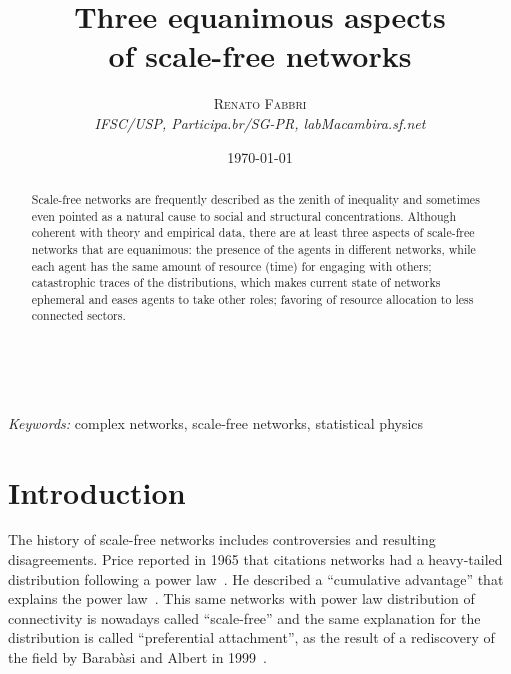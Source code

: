 \documentclass[a4paper, 11pt]{article} %
\title{\textbf{Three equanimous aspects\\of scale-free networks}\\ %
} %
\author{\textsc{Renato Fabbri} %
\\{\textit{IFSC/USP, Participa.br/SG-PR, labMacambira.sf.net}}} %
\date{\today} %
\makeatletter
\renewcommand{\maketitle}{ %
\begin{flushright} %
{\LARGE\@title} %

\vspace{50pt} %

{\large\@author} %
\\\@date %

\vspace{40pt} %
\end{flushright}
}
\makeatother
\begin{document}
\maketitle %




\begin{abstract}
Scale-free networks are frequently described as the zenith of inequality and sometimes even pointed as a natural cause to social and structural concentrations. Although coherent with theory and empirical data, there are at least three aspects of scale-free networks that are equanimous: the presence of the agents in different networks, while each agent has the same amount of resource (time) for engaging with others; catastrophic traces of the distributions, which makes current state of networks ephemeral and eases agents to take other roles; favoring of resource allocation to less connected sectors.
\end{abstract}

%

\hspace*{3,6mm}\textit{Keywords:} complex networks, scale-free networks, statistical physics %


\newpage
\tableofcontents


\section{Introduction}\label{sec:intro}
The history of scale-free networks includes controversies and resulting disagreements. Price reported in 1965 that citations networks had a heavy-tailed distribution following a power law~\cite{price1}. He described a ``cumulative advantage'' that explains the power law~\cite{price2}. This same networks with power law distribution of connectivity is nowadays called ``scale-free'' and the same explanation for the distribution is called ``preferential attachment'', as the result of a rediscovery of the field by Barab\`asi and Albert in 1999~\cite{barabasi1}.
\end{document}
